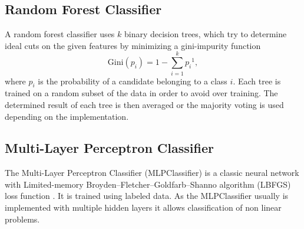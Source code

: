 \subsection{Random Forest Classifier}
A random forest classifier uses $k$ binary decision trees, which try to determine ideal cuts on the given features by minimizing a gini-impurity function
\begin{equation}
	\mathrm{Gini}(p_i) = 1 - \sum_{i=1}^{k}{p_i}^1,
\end{equation}
where $p_i$ is the probability of a candidate belonging to a class $i$.
Each tree is trained on a random subset of the data in order to avoid over training. 
The determined result of each tree is then averaged or the majority voting is used depending on the implementation. 

\subsection{Multi-Layer Perceptron Classifier}
The Multi-Layer Perceptron Classifier (MLPClassifier) is a classic neural network with Limited-memory Broyden–Fletcher–Goldfarb–Shanno algorithm (LBFGS) loss function \cite{Lossfueicecube}. It is trained using labeled data. As the MLPClassifier usually is implemented with multiple hidden layers it allows classification of non linear problems.

